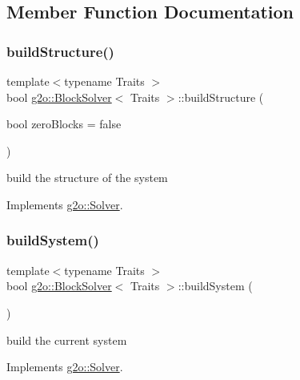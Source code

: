 \subsection{Member Function Documentation}
\mbox{\label{classg2o_1_1_block_solver_a17e4392d3cca9a9d7cf38bb46d073b86}} 
\subsubsection{\texorpdfstring{build\+Structure()}{buildStructure()}}
{\footnotesize\ttfamily template$<$typename Traits $>$ \\
bool \mbox{\hyperlink{classg2o_1_1_block_solver}{g2o\+::\+Block\+Solver}}$<$ Traits $>$\+::build\+Structure (\begin{DoxyParamCaption}\item[{bool}]{zero\+Blocks = {\ttfamily false} }\end{DoxyParamCaption})\hspace{0.3cm}{\ttfamily [virtual]}}

build the structure of the system 

Implements \mbox{\hyperlink{classg2o_1_1_solver_a6c93ac0f528ffe05867d33150c54f46f}{g2o\+::\+Solver}}.

\mbox{\label{classg2o_1_1_block_solver_a2654a8d52f38e5ce23720a8de302e2e7}} 
\subsubsection{\texorpdfstring{build\+System()}{buildSystem()}}
{\footnotesize\ttfamily template$<$typename Traits $>$ \\
bool \mbox{\hyperlink{classg2o_1_1_block_solver}{g2o\+::\+Block\+Solver}}$<$ Traits $>$\+::build\+System (\begin{DoxyParamCaption}{ }\end{DoxyParamCaption})\hspace{0.3cm}{\ttfamily [virtual]}}

build the current system 

Implements \mbox{\hyperlink{classg2o_1_1_solver_ac1565e85d5ca68a87ad7f06f8164a8c0}{g2o\+::\+Solver}}.

